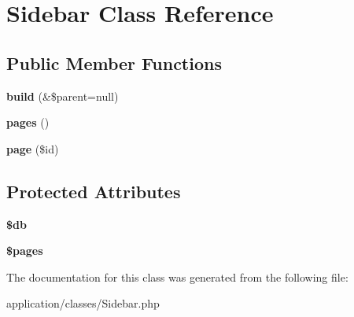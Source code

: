 \hypertarget{class_sidebar}{
\section{Sidebar Class Reference}
\label{class_sidebar}
}
\subsection*{Public Member Functions}
\begin{DoxyCompactItemize}
\item 
\hypertarget{class_sidebar_af851dbe8680ec4c6947df12894c432a7}{
{\bfseries build} (\&\$parent=null)}
\label{class_sidebar_af851dbe8680ec4c6947df12894c432a7}

\item 
\hypertarget{class_sidebar_a450e628ec018173f41250e9f0115821e}{
{\bfseries pages} ()}
\label{class_sidebar_a450e628ec018173f41250e9f0115821e}

\item 
\hypertarget{class_sidebar_a572d11a48e554db17c17c705f811e574}{
{\bfseries page} (\$id)}
\label{class_sidebar_a572d11a48e554db17c17c705f811e574}

\end{DoxyCompactItemize}
\subsection*{Protected Attributes}
\begin{DoxyCompactItemize}
\item 
\hypertarget{class_sidebar_a1fa3127fc82f96b1436d871ef02be319}{
{\bfseries \$db}}
\label{class_sidebar_a1fa3127fc82f96b1436d871ef02be319}

\item 
\hypertarget{class_sidebar_a263621399c53f2952c2329ee13ad8e4e}{
{\bfseries \$pages}}
\label{class_sidebar_a263621399c53f2952c2329ee13ad8e4e}

\end{DoxyCompactItemize}


The documentation for this class was generated from the following file:\begin{DoxyCompactItemize}
\item 
application/classes/Sidebar.php\end{DoxyCompactItemize}
